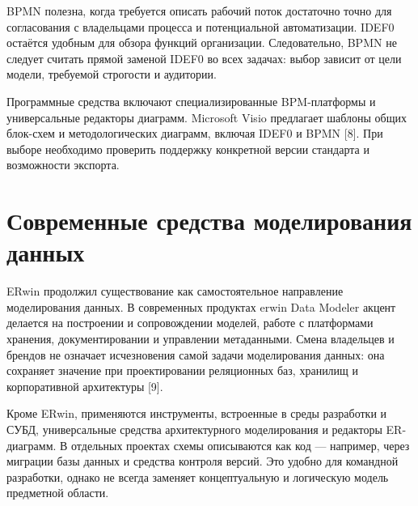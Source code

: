 \documentclass[essaypaper,paper]{pmk-graduate}
\begin{document}
\par

BPMN полезна, когда требуется описать рабочий поток достаточно точно для согласования с владельцами процесса и потенциальной автоматизации. IDEF0 остаётся удобным для обзора функций организации. Следовательно, BPMN не следует считать прямой заменой IDEF0 во всех задачах: выбор зависит от цели модели, требуемой строгости и аудитории.

\par

Программные средства включают специализированные BPM-платформы и универсальные редакторы диаграмм. Microsoft Visio предлагает шаблоны общих блок-схем и методологических диаграмм, включая IDEF0 и BPMN [8]. При выборе необходимо проверить поддержку конкретной версии стандарта и возможности экспорта.

\par

\section{Современные средства моделирования данных}

ERwin продолжил существование как самостоятельное направление моделирования данных. В современных продуктах erwin Data Modeler акцент делается на построении и сопровождении моделей, работе с платформами хранения, документировании и управлении метаданными. Смена владельцев и брендов не означает исчезновения самой задачи моделирования данных: она сохраняет значение при проектировании реляционных баз, хранилищ и корпоративной архитектуры [9].

\par

Кроме ERwin, применяются инструменты, встроенные в среды разработки и СУБД, универсальные средства архитектурного моделирования и редакторы ER-диаграмм. В отдельных проектах схемы описываются как код — например, через миграции базы данных и средства контроля версий. Это удобно для командной разработки, однако не всегда заменяет концептуальную и логическую модель предметной области.

\par

\small

\setlength{\tabcolsep}{4pt}

\renewcommand{\arraystretch}{1.15}
\end{document}
